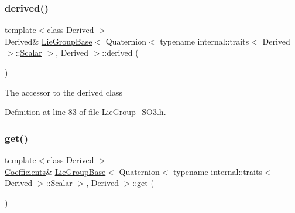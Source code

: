 \subsubsection{\texorpdfstring{derived()}{derived()}\hspace{0.1cm}{\footnotesize\ttfamily [2/2]}}
{\footnotesize\ttfamily template$<$class Derived $>$ \\
Derived\& \hyperlink{class_lie_group_base}{Lie\+Group\+Base}$<$ Quaternion$<$ typename internal\+::traits$<$ Derived $>$\+::\hyperlink{class_lie_group_base_3_01_quaternion_3_01typename_01internal_1_1traits_3_01_derived_01_4_1_1_scalar_01_4_00_01_derived_01_4_afadeceb3b98e52deecc572e71efb82a8}{Scalar} $>$, Derived $>$\+::derived (\begin{DoxyParamCaption}{ }\end{DoxyParamCaption})\hspace{0.3cm}{\ttfamily [inline]}}

The accessor to the derived class 

Definition at line 83 of file Lie\+Group\+\_\+\+S\+O3.\+h.

\hypertarget{class_lie_group_base_3_01_quaternion_3_01typename_01internal_1_1traits_3_01_derived_01_4_1_1_scalar_01_4_00_01_derived_01_4_aee7f7d466c8e6810d372733ff8cf98b6}{}\label{class_lie_group_base_3_01_quaternion_3_01typename_01internal_1_1traits_3_01_derived_01_4_1_1_scalar_01_4_00_01_derived_01_4_aee7f7d466c8e6810d372733ff8cf98b6} 
\subsubsection{\texorpdfstring{get()}{get()}\hspace{0.1cm}{\footnotesize\ttfamily [1/2]}}
{\footnotesize\ttfamily template$<$class Derived $>$ \\
\hyperlink{class_lie_group_base_3_01_quaternion_3_01typename_01internal_1_1traits_3_01_derived_01_4_1_1_scalar_01_4_00_01_derived_01_4_a05070964df6c909014295fe81ea2ac44}{Coefficients}\& \hyperlink{class_lie_group_base}{Lie\+Group\+Base}$<$ Quaternion$<$ typename internal\+::traits$<$ Derived $>$\+::\hyperlink{class_lie_group_base_3_01_quaternion_3_01typename_01internal_1_1traits_3_01_derived_01_4_1_1_scalar_01_4_00_01_derived_01_4_afadeceb3b98e52deecc572e71efb82a8}{Scalar} $>$, Derived $>$\+::get (\begin{DoxyParamCaption}{ }\end{DoxyParamCaption})\hspace{0.3cm}{\ttfamily [inline]}}

